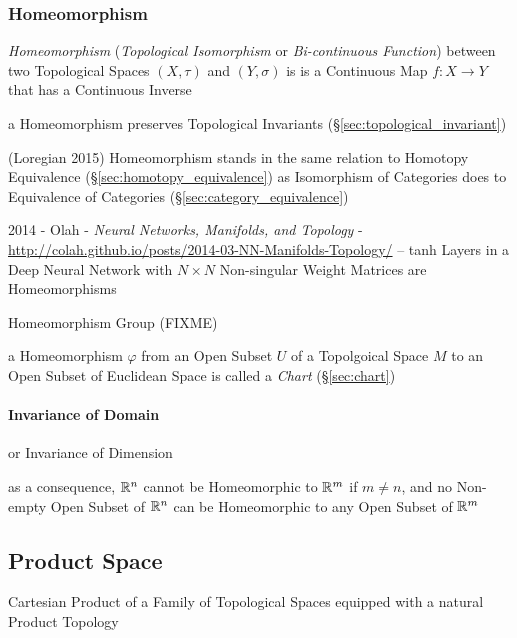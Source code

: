 \subsubsection{Homeomorphism}\label{sec:homeomorphism}

\emph{Homeomorphism} (\emph{Topological Isomorphism} or \emph{Bi-continuous
Function}) between two Topological Spaces $(X, \tau)$ and $(Y, \sigma)$ is is a
Continuous Map $f : X \rightarrow Y$ that has a Continuous Inverse

a Homeomorphism preserves Topological Invariants
(\S\ref{sec:topological_invariant})

\fist (Loregian 2015) Homeomorphism stands in the same relation to Homotopy
Equivalence (\S\ref{sec:homotopy_equivalence}) as Isomorphism of Categories does
to Equivalence of Categories (\S\ref{sec:category_equivalence})

2014 - Olah - \emph{Neural Networks, Manifolds, and Topology} -
\url{http://colah.github.io/posts/2014-03-NN-Manifolds-Topology/} -- tanh Layers
in a Deep Neural Network with $N \times N$ Non-singular Weight Matrices are
Homeomorphisms

Homeomorphism Group (FIXME)

a Homeomorphism $\varphi$ from an Open Subset $U$ of a Topolgoical Space $M$ to
an Open Subset of Euclidean Space is called a \emph{Chart} (\S\ref{sec:chart})



\paragraph{Invariance of Domain}\label{sec:domain_invariance}\hfill

or Invariance of Dimension

as a consequence, $\mathbb{R}^n$ cannot be Homeomorphic to $\mathbb{R}^m$ if $m \neq n$,
and no Non-empty Open Subset of $\mathbb{R}^n$ can be Homeomorphic to any Open
Subset of $\mathbb{R}^m$



\subsection{Product Space}\label{sec:product_space}

Cartesian Product of a Family of Topological Spaces equipped with a natural
Product Topology

